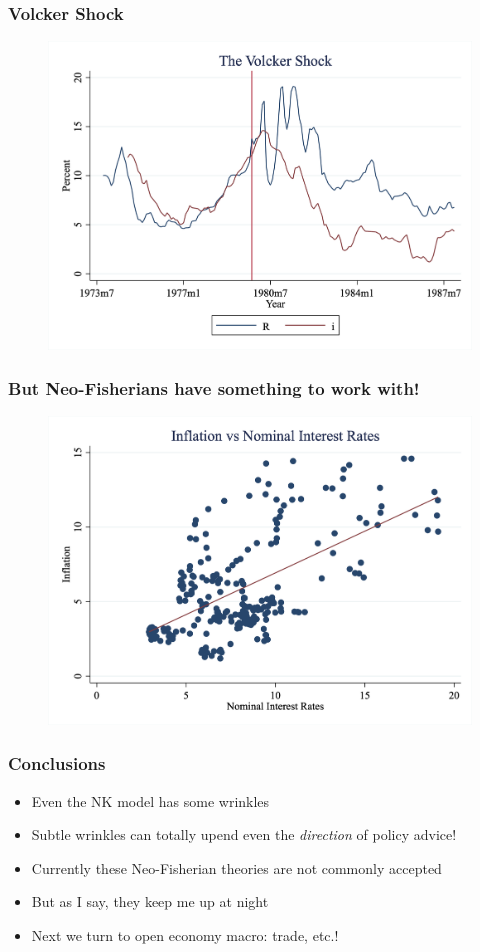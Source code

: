 \documentclass{beamer}
\begin{document}
\begin{frame}
\frametitle[alignment=center]{Volcker Shock}
\begin{figure}
\centering
\includegraphics[scale=0.35]{Figures/VolckerShock.png}
\end{figure}
\end{frame}

\begin{frame}
\frametitle[alignment=center]{But Neo-Fisherians have something to work with!}
\begin{figure}
\centering
\includegraphics[scale=0.33]{Figures/NeoFisher.png}
\end{figure}
\end{frame}

\begin{frame}
\frametitle[alignment=center]{Conclusions}
\begin{itemize}
\item Even the NK model has some wrinkles
\bigskip
\item Subtle wrinkles can totally upend even the \emph{direction} of policy advice!
\bigskip
\item Currently these Neo-Fisherian theories are not commonly accepted
\bigskip
\item But as I say, they keep me up at night
\bigskip
\item Next we turn to open economy macro: trade, etc.!
\end{itemize}
\end{frame}
\end{document}
